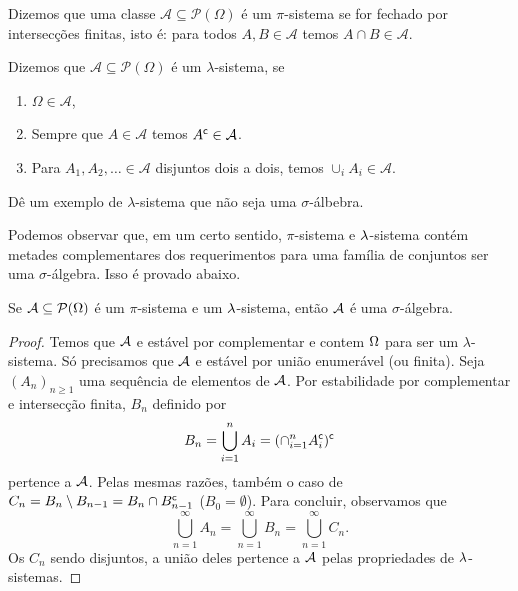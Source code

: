\documentclass[../main/Notas_de_aula.tex]{subfiles}
\begin{document}
\begin{definition}
  Dizemos que uma classe $\mathcal{A} \subseteq \mathcal{P}(\Omega)$ é um $\pi$-sistema  se for fechado por intersecções finitas, isto é: para todos $A, B \in \mathcal{A}$ temos $A \cap B \in \mathcal{A}$.
\end{definition}

\begin{definition}
  Dizemos que $\mathcal{A} \subseteq \mathcal{P}(\Omega)$ é um $\lambda$-sistema,  se
  \begin{enumerate}[\quad a)]
  \item $\Omega \in \mathcal{A}$,
  \item Sempre que $A \in \mathcal{A}$ temos $A^{\mathsf{c}} \in \mathcal{A}$.
  \item Para $A_1, A_2, \dots \in \mathcal{A}$ disjuntos dois a dois, temos $\cup_i A_i \in \mathcal{A}$.
  \end{enumerate}
\end{definition}

\begin{exercise}
  \label{x:lambda_nao_sigma}
  Dê um exemplo de $\lambda$-sistema que não seja uma $\sigma$-álbebra.
\end{exercise}
Podemos observar que, em um certo sentido, $\pi$-sistema e $\lambda$-sistema contém metades complementares dos requerimentos para uma família de conjuntos ser uma $\sigma$-álgebra.
Isso é provado abaixo.

\begin{lemma}\label{l:pilamb}
Se ${\mathcal A}\subseteq  \mathcal{P}(\Omega) $ é um $\pi$-sistema e um $\lambda$-sistema, então ${\mathcal A}$ é uma $\sigma$-álgebra.
\end{lemma}

\begin{proof}
  Temos que ${\mathcal A}$ e estável por complementar e contem $\Omega$ para ser um $\lambda$-sistema.
  Só precisamos que ${\mathcal A}$ e estável por união enumerável (ou finita).
  Seja $(A_n)_{n\ge 1}$ uma sequência de elementos de ${\mathcal A}$.
  Por estabilidade por complementar e intersecção finita, $B_n$ definido por
  \begin{equation*}
    B_n = \bigcup_{i=1}^n A_i = (\cap_{i=1}^n A_i^{\mathsf{c}})^{\mathsf{c}}
  \end{equation*}
  pertence a ${\mathcal A}$.
  Pelas mesmas razões, também o caso de $C_n=B_n\setminus B_{n-1}=B_n \cap B_{n-1}^{\mathsf{c}}$ ($B_0 = \emptyset$).
  Para concluir, observamos que
  \begin{equation*}
    \bigcup_{n=1}^\infty A_n = \bigcup_{n=1}^{\infty} B_n=  \bigcup_{n=1}^{\infty}C_n.
  \end{equation*}
  Os $C_n$ sendo disjuntos, a união deles pertence a ${\mathcal A}$ pelas propriedades de $\lambda$-sistemas.
\end{proof}
\end{document}
